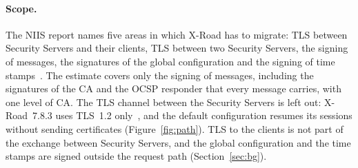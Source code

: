 \documentclass[conference,a4paper]{IEEEtran}
\newcommand{\newtext}[1]{{\color{blue}#1}}
\begin{document}
{\newtext{\paragraph{Scope.} The NIIS report names five areas in which X-Road has to migrate: TLS
between Security Servers and their clients, TLS between two Security Servers, the signing of
messages, the signatures of the global configuration and the signing of time stamps~\cite{bakhtina2026pqc}.
The estimate covers only the signing of messages, including the signatures of the CA and the OCSP
responder that every message carries\newtext{, with one level of CA. The TLS channel between the
Security Servers is left out: X-Road~7.8.3 uses TLS~1.2 only~\cite{xroadsrc}, and the default
configuration resumes its sessions without sending certificates (Figure~\ref{fig:path}). TLS to the
clients is not part of the exchange between Security Servers, and the global configuration and the
time stamps are signed outside the request path (Section~\ref{sec:bg})}.}

}
\end{document}
